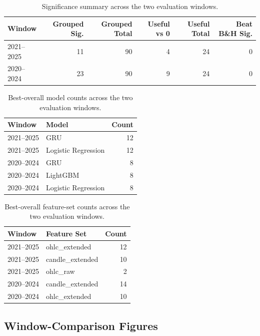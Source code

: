 \documentclass[12pt]{article}
\begin{document}
\begin{table}[H]
\centering
\caption{Significance summary across the two evaluation windows.}
\label{tab:appendix_c_significance}
\begingroup
\small
\singlespacing
\begin{tabular}{lrrrrr}
\toprule
Window & Grouped Sig. & Grouped Total & Useful vs 0 & Useful Total & Beat B\&H Sig. \\
\midrule
2021--2025 & 11 & 90 & 4 & 24 & 0 \\
2020--2024 & 23 & 90 & 9 & 24 & 0 \\
\bottomrule
\end{tabular}
\endgroup
\end{table}

\begin{table}[H]
\centering
\caption{Best-overall model counts across the two evaluation windows.}
\label{tab:appendix_c_best_models}
\begingroup
\small
\singlespacing
\begin{tabular}{llr}
\toprule
Window & Model & Count \\
\midrule
2021--2025 & GRU & 12 \\
2021--2025 & Logistic Regression & 12 \\
2020--2024 & GRU & 8 \\
2020--2024 & LightGBM & 8 \\
2020--2024 & Logistic Regression & 8 \\
\bottomrule
\end{tabular}
\endgroup
\end{table}

\begin{table}[H]
\centering
\caption{Best-overall feature-set counts across the two evaluation windows.}
\label{tab:appendix_c_best_features}
\begingroup
\small
\singlespacing
\begin{tabular}{llr}
\toprule
Window & Feature Set & Count \\
\midrule
2021--2025 & ohlc\_extended & 12 \\
2021--2025 & candle\_extended & 10 \\
2021--2025 & ohlc\_raw & 2 \\
2020--2024 & candle\_extended & 14 \\
2020--2024 & ohlc\_extended & 10 \\
\bottomrule
\end{tabular}
\endgroup
\end{table}

\subsection{Window-Comparison Figures}
\end{document}
